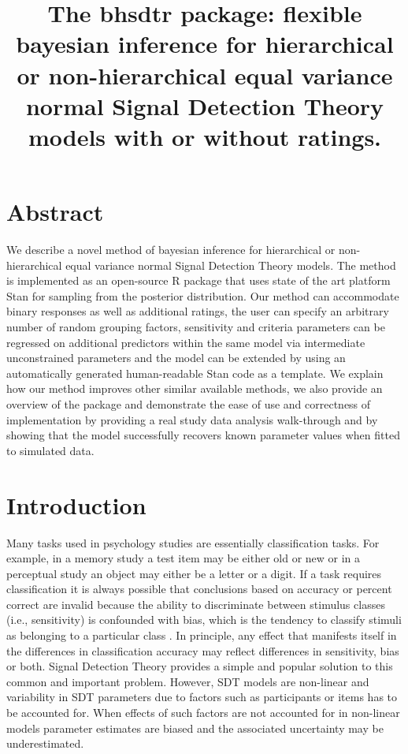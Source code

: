 \documentclass[oneside,a4paper]{article}
\title{The bhsdtr package: flexible bayesian inference for
  hierarchical or non-hierarchical equal variance normal Signal
  Detection Theory models with or without ratings.}
\begin{document}
\tableofcontents{}

\section{Abstract}

We describe a novel method of bayesian inference for hierarchical or
non-hierarchical equal variance normal Signal Detection Theory
models. The method is implemented as an open-source R package that
uses state of the art platform Stan for sampling from the posterior
distribution. Our method can accommodate binary responses as well as
additional ratings, the user can specify an arbitrary number of random
grouping factors, sensitivity and criteria parameters can be regressed
on additional predictors within the same model via intermediate
unconstrained parameters and the model can be extended by using an
automatically generated human-readable Stan code as a template. We
explain how our method improves other similar available methods, we
also provide an overview of the package and demonstrate the ease of
use and correctness of implementation by providing a real study data
analysis walk-through and by showing that the model successfully
recovers known parameter values when fitted to simulated data.

\section{Introduction}

Many tasks used in psychology studies are essentially classification
tasks. For example, in a memory study a test item may be either old or
new or in a perceptual study an object may either be a letter or a
digit. If a task requires classification it is always possible that
conclusions based on accuracy or percent correct are invalid because
the ability to discriminate between stimulus classes (i.e.,
sensitivity) is confounded with bias, which is the tendency to
classify stimuli as belonging to a particular class
\cite{GreenSwets66}. In principle, any effect that manifests itself in
the differences in classification accuracy may reflect differences in
sensitivity, bias or both. Signal Detection Theory provides a simple
and popular solution to this common and important problem. However,
SDT models are non-linear and variability in SDT parameters due to
factors such as participants or items has to be accounted for. When
effects of such factors are not accounted for in non-linear models
parameter estimates are biased and the associated uncertainty may be
underestimated.
\end{document}
